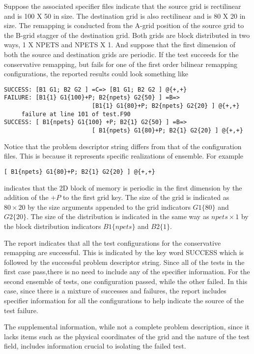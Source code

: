 Suppose the associated specifier files indicate that the source grid is rectilinear and is 100 X 50 in size. The destination grid is also rectilinear and is 80 X 20 in size. The remapping is conducted from the A-grid position of the source grid to the B-grid stagger of the destination grid. Both grids are block distributed in two ways, 1 X NPETS and NPETS X 1. And suppose that the first dimension of both the source and destination grids are periodic. If the test succeeds for the conservative remapping, but fails for one of the first order bilinear remapping configurations, the reported results
could look something like
\begin{center}
\begin{verbatim}
SUCCESS: [B1 G1; B2 G2 ] =C=> [B1 G1; B2 G2 ] @{+,+}
FAILURE: [B1{1} G1{100}+P; B2{npets} G2{50} ] =B=> 
                         [B1{1} G1{80}+P; B2{npets} G2{20} ] @{+,+}
     failure at line 101 of test.F90
SUCCESS: [ B1{npets} G1{100} +P; B2{1} G2{50} ] =B=> 
                         [ B1{npets} G1{80}+P; B2{1} G2{20} ] @{+,+}
\end{verbatim}
\end{center}
Notice that the problem descriptor string differs from that of the configuration files. This is because it represents specific realizations of ensemble. For example 
\begin{center}
\begin{verbatim}
[ B1{npets} G1{80}+P; B2{1} G2{20} ] @{+,+}
\end{verbatim}
\end{center}
indicates that the 2D block of memory is periodic in the first dimension by the addition of the $+P$ to the first grid key. The size of the grid is indicated as $80 \times 20$ by the size arguments appended to the grid indicators $G1 \{80 \}$ and $G2 \{ 20 \}$. The size of the distribution is indicated in the same way as $npets \times 1$ by the block distribution indicators $B1 \{ npets \}$ and $B2 \{ 1 \}$.

The report indicates that all the test configurations for the conservative remapping are successful. This is indicated by the key word SUCCESS which is followed by the successful problem descriptor string. Since all of the tests in the first case pass,there is no need to include any of the specifier information. For the second ensemble of tests, one configuration passed, while the other failed. In this case, since there is a mixture of successes and failures, the report includes specifier information for all the configurations to help indicate the source of the test failure. 


The supplemental information, while not a complete problem description, since it lacks items such as the physical coordinates of the grid and the nature of the test field, includes information crucial to isolating the failed test.





